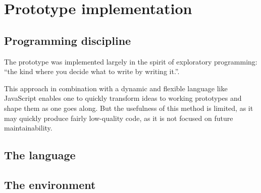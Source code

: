 \chapter{Prototype implementation}\label{chap:impl}

\section{Programming discipline}
The prototype was implemented largely in the spirit of exploratory programming:
``the kind where you decide what to write by writing
it.''\cite{arc}.

This approach in combination with a dynamic and flexible language like
JavaScript enables one to quickly transform ideas to working prototypes and
shape them as one goes along. But the usefulness of this method is limited, as
it may quickly produce fairly low-quality code, as it is not focused on future
maintainability.

\section{The language}

\section{The environment}

